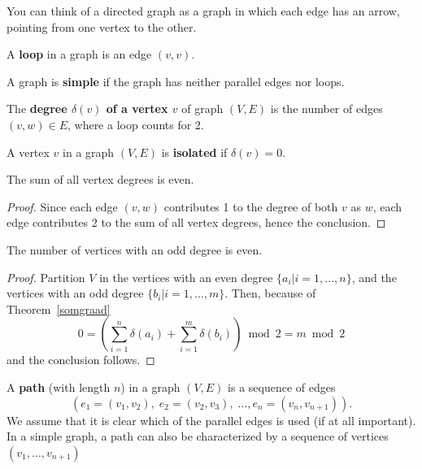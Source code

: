 You can think of a directed graph as a graph in which each edge has an
arrow, pointing from one vertex to the other.


\begin{definition}[Loop]
  \textup{A \textbf{loop} in a graph is an edge $(v,v)$. }
\end{definition}


\begin{definition}
\textup{A graph is \textbf{simple} if the graph has neither parallel edges
nor loops.}
\end{definition}


\begin{definition}
  \textup{The \textbf{degree $\delta(v)$ of a vertex $v$} of graph
$(V,E)$ is the number of edges $(v,w) \in E$, where a loop counts for 2.}
\end{definition}


\begin{definition}
A vertex $v$ in a graph $(V,E)$ is {\bf isolated} if $\delta(v)=0$.
\end{definition}


\begin{theorem} \label{somgraad}
The sum of all vertex degrees is even.
\end{theorem}
\begin{proof}
Since each edge $(v,w)$ contributes 1 to the degree of both $v$ as
$w$, each edge contributes 2 to the sum of all vertex degrees, hence
the conclusion.
\end{proof}


\begin{theorem}
The number of vertices with an odd degree is even.
\end{theorem}
\begin{proof}
Partition $V$ in the vertices with an even degree $\{a_i |
i=1,\ldots,n\}$, and the vertices with an odd degree $\{b_i |
i=1,\ldots,m\}$.  Then, because of Theorem~\ref{somgraad}
\[0 = \left(\sum_{i=1}^{n} \delta(a_{i}) + \sum_{i=1}^{m} \delta(b_{i})\right)
\bmod 2 = m \bmod 2 \] and the conclusion follows.  \end{proof}


\begin{definition}[Path]
\textup{A \textbf{path} (with length $n$) in a graph $(V,E)$ is a
sequence of edges
\[( e_1=(v_{1},v_{2}),\;e_2=(v_{2},v_{3}),\;\ldots, e_{n}=(v_{n},v_{n+1})).\]
We assume that it is clear which of the parallel edges is used (if at
all important). \\
In a simple graph, a path can also be characterized by a sequence of
vertices $(v_{1}, \ldots , v_{n+1})$}
\end{definition}

